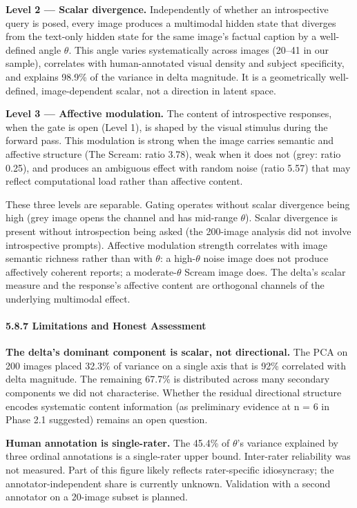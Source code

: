 \documentclass[11pt,a4paper]{article}
\begin{document}
\textbf{Level 2 --- Scalar divergence.} Independently of whether an introspective query is posed, every image produces a multimodal hidden state that diverges from the text-only hidden state for the same image's factual caption by a well-defined angle $\theta$. This angle varies systematically across images (20\textdegree{}--41\textdegree{} in our sample), correlates with human-annotated visual density and subject specificity, and explains 98.9\% of the variance in delta magnitude. It is a geometrically well-defined, image-dependent scalar, not a direction in latent space.

\textbf{Level 3 --- Affective modulation.} The content of introspective responses, when the gate is open (Level 1), is shaped by the visual stimulus during the forward pass. This modulation is strong when the image carries semantic and affective structure (The Scream: ratio 3.78), weak when it does not (grey: ratio 0.25), and produces an ambiguous effect with random noise (ratio 5.57) that may reflect computational load rather than affective content.

These three levels are separable. Gating operates without scalar divergence being high (grey image opens the channel and has mid-range $\theta$). Scalar divergence is present without introspection being asked (the 200-image analysis did not involve introspective prompts). Affective modulation strength correlates with image semantic richness rather than with $\theta$: a high-$\theta$ noise image does not produce affectively coherent reports; a moderate-$\theta$ Scream image does. The delta's scalar measure and the response's affective content are orthogonal channels of the underlying multimodal effect.

\paragraph{5.8.7 Limitations and Honest Assessment}

\textbf{The delta's dominant component is scalar, not directional.} The PCA on 200 images placed 32.3\% of variance on a single axis that is 92\% correlated with delta magnitude. The remaining 67.7\% is distributed across many secondary components we did not characterise. Whether the residual directional structure encodes systematic content information (as preliminary evidence at n = 6 in Phase 2.1 suggested) remains an open question.

\textbf{Human annotation is single-rater.} The 45.4\% of $\theta$'s variance explained by three ordinal annotations is a single-rater upper bound. Inter-rater reliability was not measured. Part of this figure likely reflects rater-specific idiosyncrasy; the annotator-independent share is currently unknown. Validation with a second annotator on a 20-image subset is planned.
\end{document}
